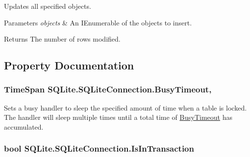 Updates all specified objects. 


\begin{DoxyParams}{Parameters}
{\em objects} & An I\-Enumerable of the objects to insert. \\
\hline
\end{DoxyParams}
\begin{DoxyReturn}{Returns}
The number of rows modified. 
\end{DoxyReturn}


\subsection{Property Documentation}
\hypertarget{classSQLite_1_1SQLiteConnection_a825c0ebf745f8424ee0e8444b13cb6ff}{
\subsubsection[{Busy\-Timeout}]{\setlength{\rightskip}{0pt plus 5cm}Time\-Span S\-Q\-Lite.\-S\-Q\-Lite\-Connection.\-Busy\-Timeout\hspace{0.3cm}{\ttfamily [get]}, {\ttfamily [set]}}}\label{classSQLite_1_1SQLiteConnection_a825c0ebf745f8424ee0e8444b13cb6ff}


Sets a busy handler to sleep the specified amount of time when a table is locked. The handler will sleep multiple times until a total time of \hyperlink{classSQLite_1_1SQLiteConnection_a825c0ebf745f8424ee0e8444b13cb6ff}{Busy\-Timeout} has accumulated. 

\hypertarget{classSQLite_1_1SQLiteConnection_a82a4af3768596d6d0031110be9f56ae0}{
\subsubsection[{Is\-In\-Transaction}]{\setlength{\rightskip}{0pt plus 5cm}bool S\-Q\-Lite.\-S\-Q\-Lite\-Connection.\-Is\-In\-Transaction\hspace{0.3cm}{\ttfamily [get]}}}\label{classSQLite_1_1SQLiteConnection_a82a4af3768596d6d0031110be9f56ae0}


